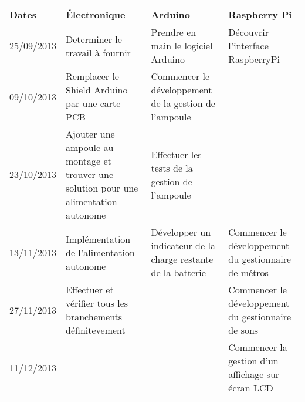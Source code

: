 \begin{center}
	\begin{tabular}{| l | m{3.5cm} | m{3.5cm} | m{3.5cm} |}
		
		\hline
		\textbf{Dates} & \textbf{Électronique} & \textbf{Arduino} & \textbf{Raspberry Pi} \\ \hline
		25/09/2013 & Determiner le travail à fournir & Prendre en main le logiciel Arduino & Découvrir l'interface RaspberryPi \\ \hline
		
		09/10/2013 & Remplacer le Shield Arduino par une carte PCB & Commencer le développement de la gestion de l'ampoule & \\ \hline
		
		23/10/2013 & Ajouter une ampoule au montage et trouver une solution pour une alimentation autonome	& Effectuer les tests de la gestion de l'ampoule & \\ \hline
		
		13/11/2013 & Implémentation de l'alimentation autonome & Développer un indicateur de la charge restante de la batterie & Commencer le développement du gestionnaire de métros \\ \hline
		
		27/11/2013 & Effectuer et vérifier tous les branchements définitevement & & Commencer le développement du gestionnaire de sons\\ \hline
		
		11/12/2013 & & & Commencer la gestion d'un affichage sur écran LCD \\ \hline
		
	\end{tabular}
\end{center}